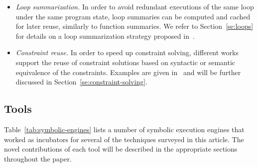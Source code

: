 \begin{itemize}
\item {\em Loop summarization.} In order to avoid redundant executions of the same loop under the same program state, loop summaries can be computed and cached for later reuse, similarly to function summaries. We refer to Section~\ref{se:loops} for details on a loop summarization strategy proposed in~\cite{GL-ISSTA11}.

\item {\em Constraint reuse.} In order to speed up constraint solving, different works support the reuse of constraint  solutions based on syntactic or semantic equivalence of the constraints. Examples are given in~\cite{EXE-CCS06,KLEE-OSDI08,MEMO-ISSTA12,GREEN-FSE12} and will be further discussed in Section~\ref{se:constraint-solving}.

\end{itemize}


\subsection{Tools}

Table~\ref{tab:symbolic-engines} lists a number of symbolic execution engines that worked as incubators for several of the techniques surveyed in this article. The novel contributions of each tool will be described in the appropriate sections throughout the paper.

